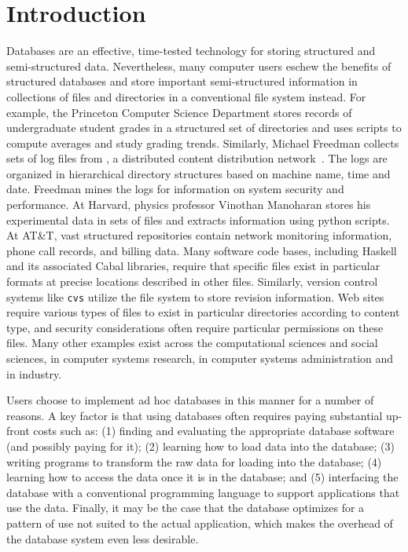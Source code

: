 
\section {Introduction}
\label{sec:intro}

Databases are an effective, time-tested technology for storing
structured and semi-structured data.  Nevertheless, many computer
users eschew the benefits of structured databases and store important
semi-structured information in collections of files
and directories in a conventional file system instead.  For example, the
Princeton Computer Science Department
stores records of undergraduate student grades in a structured set of
directories and uses scripts to compute averages and
study grading trends.  Similarly, Michael Freedman collects
sets of log files from \coral, a distributed content distribution
network~\cite{freedman+:coral,freedman:coral-experience}.  
The logs are organized in hierarchical
directory structures based on machine name, time and date.  Freedman
mines the logs for information on system security and performance.  At
Harvard, physics professor Vinothan Manoharan stores 
his experimental data in sets of files and
extracts information using python scripts.  At AT\&T, vast structured
repositories contain network monitoring information,
phone call records, and billing data.  
Many software code bases, including Haskell and its associated Cabal libraries,
require that specific files exist in particular formats at precise
locations described in other files. 
Similarly, version control systems like \texttt{cvs} utilize the file
system to store revision information. Web sites require various types
of files to exist in particular directories according to content type,
and security considerations often require particular permissions on
these files.
Many other examples exist across the computational sciences and social
sciences, in computer systems research, in computer
systems administration and in industry.

Users choose to implement ad hoc databases in this manner for a number
of reasons. A key factor is  that using
databases often requires paying substantial up-front costs such as:
(1) finding and evaluating the appropriate database software (and
possibly paying for it); (2) learning how to load data into the
database; (3) writing programs to transform the raw data for loading into the database; (4) learning how
to access the data once it is in the database; and (5) interfacing the
database with a conventional programming language to support
applications that use the data.  Finally, it may be the case that the
database optimizes for a pattern of use not suited to the actual
application, which makes the overhead of the database system even
less desirable. 

